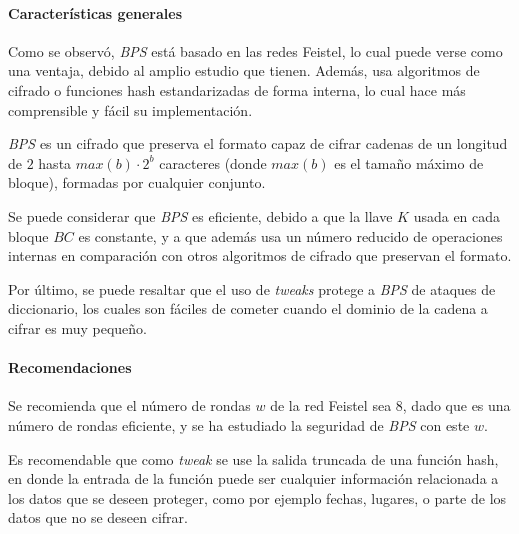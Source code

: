 \paragraph{Características generales}

Como se observó, \textit{BPS} está basado en las redes Feistel, lo cual puede
verse como una ventaja, debido al amplio estudio que tienen. Además, usa
algoritmos de cifrado o funciones hash estandarizadas de forma interna, lo
cual hace más comprensible y fácil su implementación.

\textit{BPS} es un cifrado que preserva el formato capaz de cifrar cadenas de
un longitud de $2$ hasta $max(b) \cdot 2^{b}$ caracteres (donde $max(b)$ es el
tamaño máximo de bloque), formadas por cualquier conjunto.

Se puede considerar que \textit{BPS} es eficiente, debido a que la llave $K$
usada en cada bloque $BC$ es constante, y a que además usa un número reducido
de operaciones internas en comparación con otros algoritmos de cifrado que
preservan el formato.

Por último, se puede resaltar que el uso de \textit{tweaks} protege a \textit{BPS} de
ataques de diccionario, los cuales son fáciles de cometer cuando el dominio
de la cadena a cifrar es muy pequeño.


\paragraph{Recomendaciones}

Se recomienda que el número de rondas $w$ de la red Feistel sea $8$, dado
que es una número de rondas eficiente, y se ha estudiado la seguridad de
\textit{BPS} con este $w$.

Es recomendable que como \textit{tweak} se use la salida truncada de una función hash,
en donde la entrada de la función puede ser cualquier información relacionada
a los datos que se deseen proteger, como por ejemplo fechas, lugares, o parte
de los datos que no se deseen cifrar.

